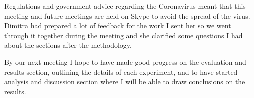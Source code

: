 Regulations and government advice regarding the Coronavirus meant that this meeting and future meetings are held on Skype to avoid the spread of the virus. Dimitra had prepared a lot of feedback for the work I sent her so we went through it together during the meeting and she clarified some questions I had about the sections after the methodology.

By our next meeting I hope to have made good progress on the evaluation and results section, outlining the details of each experiment, and to have started analysis and discussion section where I will be able to draw conclusions on the results.